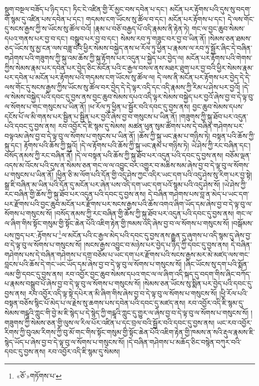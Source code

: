 སྡུག་བསྔལ་བཟོད་པ་ཉིད་དང་། ཏིང་ངེ་འཛིན་གྱི་རོ་མྱང་བས་དབེན་པ་དང་། མངོན་པར་རྟོགས་པའི་དུས་སུ་བདག་གོ་སྙམ་དུ་འཛིན་པས་དབེན་པ་དང་། གདམས་ངག་ཡོངས་སུ་ཚོལ་བ་དང་། མངོན་པར་རྟོགས་པ་དང་། དེ་ལས་གོང་དུ་སངས་རྒྱས་ཀྱི་ས་ཡོངས་སུ་ཚོལ་བའོ། །རྣམ་པ་བཅོ་བརྒྱད་པོ་འདི་རྣམས་ནི་རྟེན་ཏེ། གང་ལ་བྱང་ཆུབ་སེམས་དཔའ་གནས་པར་བྱ་བ་དང་། བསྒྲུབ་པར་བྱ་བ་དང་། སེམས་རབ་ཏུ་གཟུང་བར་བྱ་བ་ཡིན་ནོ། །སེམས་ཅན་ཐམས་ཅད་ཡོངས་སུ་མྱ་ངན་ལས་བཟླ་བའི་ཕྱིར་སེམས་བསྐྱེད་ནས་ཕ་རོལ་ཏུ་ཕྱིན་པ་རྣམས་ལ་རབ་ཏུ་སྦྱོར་ཞིང་དེ་བཞིན་གཤེགས་པའི་གཟུགས་ཀྱི་སྐུ་འམ་ཆོས་ཀྱི་སྐུ་རྟོགས་པར་འདུན་པ་སྐྱེད་པར་བྱེད་ལ། མངོན་པར་རྟོགས་པའི་གེགས་ཀྱིས་སེམས་རྣམ་པར་དབེན་པར་བྱེད་ཅིང་མངོན་པའི་ང་རྒྱལ་བསལ་ནས་མཐར་ཐུག་པར་བྱ་བའི་ཕྱིར་སེམས་རྣམ་པར་དབེན་པ་མངོན་པར་རྟོགས་པའི་གདམས་ངག་ཡོངས་སུ་ཚོལ་ལ། དེ་ལས་ནི་མངོན་པར་རྟོགས་པར་བྱེད་དེ་དེ་ལས་གོང་དུ་སངས་རྒྱས་ཀྱིས་ཡོངས་སུ་ཚོལ་བར་བྱེད་དེ་དེ་ལྟར་འདི་དང་འདི་རྣམས་ཀྱི་རིམ་པ་ཤེས་པར་བྱའོ། །དེ་ལ་སེམས་བསྐྱེད་པའི་དབང་དུ་བྱས་ནས་བྱང་ཆུབ་སེམས་དཔའ་འདི་ལྟར་སེམས་བསྐྱེད་པར་བྱའོ་ཞེས་བྱ་བ་དེ་ལྟ་བུ་ལ་སོགས་པ་གང་གསུངས་པ་ཡིན་ནོ། །ཕ་རོལ་ཏུ་ཕྱིན་པ་སྦྱོར་བའི་དབང་དུ་བྱས་ནས། བྱང་ཆུབ་སེམས་དཔས་དངོས་པོ་ལ་མི་གནས་པར་སྦྱིན་པ་སྦྱིན་པར་བྱའོ་ཞེས་བྱ་བ་གསུངས་པ་ཡིན་ནོ། །གཟུགས་ཀྱི་སྐུ་ཐོབ་པར་འདུན་པའི་དབང་དུ་བྱས་ནས། རབ་འབྱོར་དེ་ཇི་སྙམ་དུ་སེམས། མཚན་ཕུན་སུམ་ཚོགས་པས་དེ་བཞིན་གཤེགས་པར་བལྟའམ་ཞེས་བྱ་བ་དེ་ལྟ་བུ་ལ་སོགས་པ་གསུངས་པ་ཡིན་ནོ། །ཆོས་ཀྱི་སྐུ་ཡང་རྣམ་པ་གཉིས་ཏེ། བསྟན་པའི་ཆོས་ཀྱི་སྐུ་དང་། རྟོགས་པའི་ཆོས་ཀྱི་སྐུའོ། །དེ་ལ་རྟོགས་པའི་ཆོས་ཀྱི་སྐུ་ཡང་རྣམ་པ་གཉིས་ཏེ། ཡེ་ཤེས་ཀྱི་རང་བཞིན་དང་། བསོད་ནམས་ཀྱི་རང་བཞིན་ནོ། །དེ་ལ་བསྟན་པའི་ཆོས་ཀྱི་སྐུ་ཐོབ་པར་འདུན་པའི་དབང་དུ་བྱས་ནས། བཅོམ་ལྡན་འདས་མ་འོངས་པའི་དུས་ན་སེམས་ཅན་གང་ལ་ལ་འབྱུང་བར་འགྱུར་བ་མཆིས་སམ་ཞེས་བྱ་བ་དེ་ལྟ་བུ་ལ་སོགས་པ་གསུངས་པ་ཡིན་ནོ། །ཕྱིན་ཅི་མ་ལོག་པའི་དོན་གྱི་འདུ་ཤེས་ཀྱང་འདིར་ཡང་དག་པའི་འདུ་ཤེས་སུ་རིག་པར་བྱ་སྟེ། སྒྲ་ཇི་བཞིན་མ་ཡིན་པའི་དོན་དུ་མངོན་པར་ཞེན་པས་འདི་དག་ཡང་དག་པའོ་སྙམ་པའི་འདུ་ཤེས་སོ། །ཡེ་ཤེས་ཀྱི་རང་བཞིན་གྱི་ཆོས་ཀྱི་སྐུ་ཐོབ་པར་འདུན་པའི་དབང་དུ་བྱས་ནས། དེ་བཞིན་གཤེགས་པས་བླ་ན་མེད་པ་ཡང་དག་པར་རྫོགས་པའི་བྱང་ཆུབ་མངོན་པར་རྫོགས་པར་སངས་རྒྱས་པའི་ཆོས་འགའ་ཞིག་ཡོད་དམ་ཞེས་བྱ་བ་དེ་ལྟ་བུ་ལ་སོགས་པ་གསུངས་སོ། །བསོད་ནམས་ཀྱི་རང་བཞིན་གྱི་ཆོས་ཀྱི་སྐུ་ཐོབ་པར་འདུན་པའི་དབང་དུ་བྱས་ནས། གང་ལ་ལ་ཞིག་གིས་སྟོང་གསུམ་གྱི་སྟོང་ཆེན་པོའི་འཇིག་རྟེན་གྱི་ཁམས་འདི་ཞེས་བྱ་བ་ལ་སོགས་པ་གསུངས་སོ། །བསྒོམས་པས་ཁྱད་པར་:རྟོགས་པ་\footnote{«ཅོ་»གཏོགས་པ་}ལ་མངོན་པའི་ང་རྒྱལ་མེད་པའི་དབང་དུ་བྱས་ནས་རྒྱུན་དུ་ཞུགས་པ་འདི་སྙམ་དུ་ཞེས་བྱ་བ་དེ་ལྟ་བུ་ལ་སོགས་པ་གསུངས་སོ། །སངས་རྒྱས་འབྱུང་བ་མཉེས་པར་བྱེད་པ་ཉིད་ཀྱི་དབང་དུ་བྱས་ནས། དེ་བཞིན་གཤེགས་པས་དེ་བཞིན་གཤེགས་པ་དགྲ་བཅོམ་པ་ཡང་དག་པར་རྫོགས་པའི་སངས་རྒྱས་མར་མེ་མཛད་ལས་གང་བླངས་པའི་ཆོས་དེ་གང་ཡང་ཡོད་དམ་ཞེས་བྱ་བ་དེ་ལྟ་བུ་ལ་སོགས་པ་གསུངས་སོ། །ཞིང་ཡོངས་སུ་དག་པའི་སྨོན་ལམ་གྱི་དབང་དུ་བྱས་ནས། རབ་འབྱོར་བྱང་ཆུབ་སེམས་དཔའ་གང་ལ་ལ་ཞིག་འདི་སྐད་དུ་བདག་གིས་ཞིང་བཀོད་པ་རྣམས་བསྒྲུབ་པོ་ཞེས་བྱ་བ་དེ་ལྟ་བུ་ལ་སོགས་པ་གསུངས་སོ། །སེམས་ཅན་ཡོངས་སུ་སྨིན་པར་བྱེད་པའི་དབང་དུ་བྱས་ནས། རབ་འབྱོར་འདི་ལྟ་སྟེ་དཔེར་ན་མི་ཞིག་གིས་ཞེས་བྱ་བ་དེ་ལྟ་བུ་ལ་སོགས་པ་གསུངས་སོ། །ཕྱི་རོལ་པའི་བསྟན་བཅོས་སྙིང་པོ་མེད་པ་ལ་རྗེས་སུ་ཆགས་པས་དབེན་པའི་དབང་དུ་མཛད་ནས། རབ་འབྱོར་འདི་ཇི་སྙམ་དུ་སེམས་གངྒཱའི་ཀླུང་གི་བྱེ་མ་ཇི་སྙེད་པ་དེ་སྙེད་ཀྱི་གངྒཱའི་ཀླུང་དུ་གྱུར་ལ་ཞེས་བྱ་བ་དེ་ལྟ་བུ་ལ་སོགས་པ་གསུངས་སོ། །གཟུགས་ཀྱི་སེམས་ཅན་གྱི་ལུས་ལ་རིལ་པོར་འཛིན་པ་དང་བྲལ་བའི་སྦྱོར་བའི་དབང་དུ་བྱས་ནས། ཡང་རབ་འབྱོར་རིགས་ཀྱི་བུའམ་རིགས་ཀྱི་བུ་མོ་གང་གིས་སྟོང་གསུམ་གྱི་སྟོང་ཆེན་པོའི་འཇིག་རྟེན་གྱི་ཁམས་ན་སའི་རྡུལ་རྣམས་ཇི་སྙེད་ཡོད་པ་ཞེས་བྱ་བ་དེ་ལྟ་བུ་ལ་སོགས་པ་གསུངས་སོ། །དེ་བཞིན་གཤེགས་པ་མཆོད་ཅིང་བསྙེན་བཀུར་བའི་དབང་དུ་བྱས་ནས། རབ་འབྱོར་འདི་ཇི་སྙམ་དུ་སེམས། 